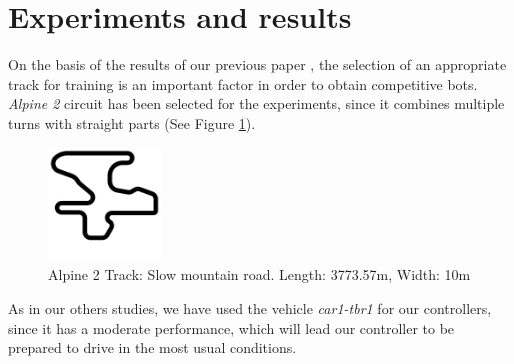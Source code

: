\documentclass[10pt,journal,compsoc]{IEEEtran}
\begin{document}







\section{Experiments and results}  
\label{sec:results}


On the basis of the results of our previous paper \cite{salem_cig2018}, the selection of an appropriate track for training is an important factor in order to obtain competitive bots. \textit{Alpine 2} circuit has been selected for the experiments, since it combines multiple turns with straight parts (See Figure \ref{fig:alpine2_track}).

\begin{figure}[!ht]	
	\begin{center}
		\includegraphics[width=3cm]{fig/alpine2.jpg}
		\caption{Alpine 2 Track: Slow mountain road. Length: 3773.57m, Width: 10m}
		\label{fig:alpine2_track}	
	\end{center}	
\end{figure}

As in our others studies, we have used the vehicle \textit{car1-tbr1} for our controllers, since it has a moderate performance, which will lead our controller to be prepared to drive in the most usual conditions.
\end{document}
